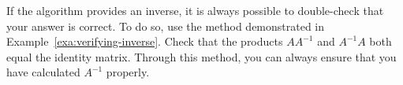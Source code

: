 If the algorithm provides an inverse, it is always possible to
double-check that your answer is correct.  To do so, use the method
demonstrated in Example~\ref{exa:verifying-inverse}. Check that the
products $AA^{-1}$ and $A^{-1}A$ both equal the identity
matrix. Through this method, you can always ensure that you have
calculated $A^{-1}$ properly.

